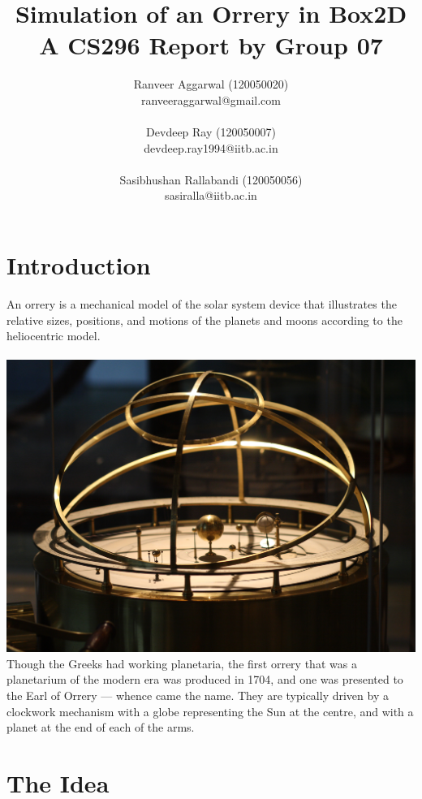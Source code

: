 \documentclass[12pt]{article}
\title{Simulation of an Orrery in Box2D\\ A CS296 Report by Group 07}
\author{Ranveer Aggarwal (120050020) \\ ranveeraggarwal@gmail.com \\ \\ Devdeep Ray (120050007) \\ devdeep.ray1994@iitb.ac.in\\ \\Sasibhushan Rallabandi (120050056) \\ sasiralla@iitb.ac.in}
\date{}
\begin{document}
\maketitle

\section{Introduction}
An orrery is a mechanical model of the solar system device that illustrates the relative sizes, positions, and motions of the planets and moons according to the heliocentric model.
\\
\\
\includegraphics[scale=0.8]{./img/orrery-main.jpg}
\\
Though the Greeks had working planetaria, the first orrery that was a planetarium of the modern era was produced in 1704, and one was presented to the Earl of Orrery — whence came the name. They are typically driven by a clockwork mechanism with a globe representing the Sun at the centre, and with a planet at the end of each of the arms.

\section{The Idea}
\end{document}
